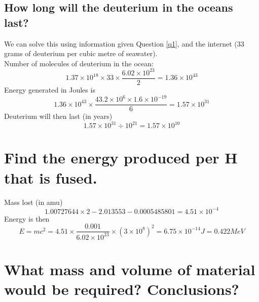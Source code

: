 \documentclass[answers]{exam}
\begin{document}
\begin{questions}
\begin{parts}
\part{How long will the deuterium in the oceans last?}

\begin{solution}
    We can solve this using information given Question \ref{q1}, and the internet (33 grams of deuterium per cubic metre of seawater). \\
    Number of molecules of deuterium in the ocean:
    $$1.37 \times 10^{18} \times 33 \times \frac{6.02\times10^{23}}{2} = 1.36 \times 10^{43}$$
    Energy generated in Joules is
    $$1.36 \times 10^{43} \times \frac{43.2 \times 10^6 \times 1.6 \times 10^{-19}}{6} = 1.57 \times 10^{31}$$
    Deuterium will then last (in years)
    $$1.57 \times 10^{31} \div 10^{21} = 1.57 \times 10^{10}$$
\end{solution}

\end{parts}


\begin{parts}

\part{Find the energy produced per H that is fused.}

\begin{solution}
    Mass lost (in amu)
    $$1.00727644 \times 2 - 2.013553 - 0.0005485801 = 4.51 \times 10^{-4}$$
    Energy is then
    $$E = mc^2 = 4.51 \times \frac{0.001}{6.02\times10^{23}} \times (3 \times 10^8)^2 = 6.75 \times 10^{-14} \unit{J} = 0.422 \unit{MeV}$$
\end{solution}

\part{What mass and volume of material would be required? Conclusions?}


\end{parts}
\end{questions}
\end{document}
